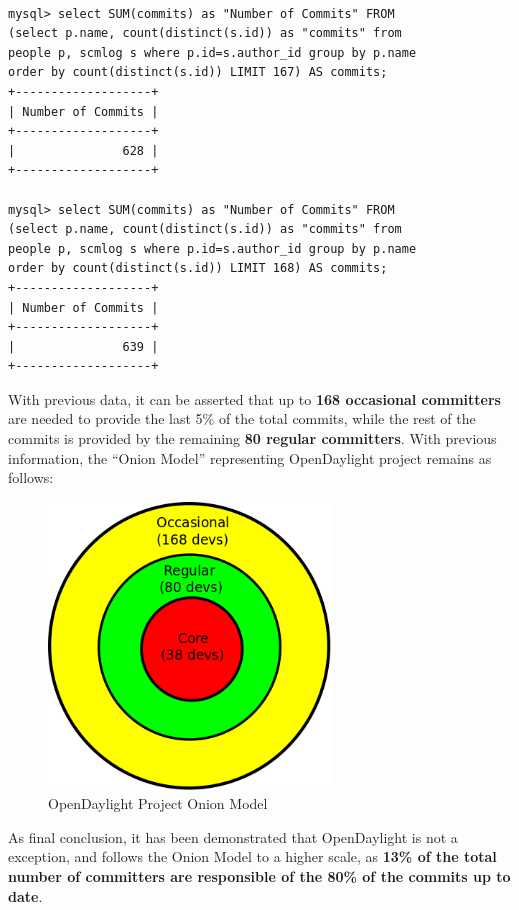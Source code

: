 \documentclass[a4paper, 12pt]{book}
\begin{document}
\begin{verbatim}

mysql> select SUM(commits) as "Number of Commits" FROM
(select p.name, count(distinct(s.id)) as "commits" from
people p, scmlog s where p.id=s.author_id group by p.name
order by count(distinct(s.id)) LIMIT 167) AS commits;
+-------------------+
| Number of Commits |
+-------------------+
|               628 |
+-------------------+

mysql> select SUM(commits) as "Number of Commits" FROM
(select p.name, count(distinct(s.id)) as "commits" from
people p, scmlog s where p.id=s.author_id group by p.name
order by count(distinct(s.id)) LIMIT 168) AS commits;
+-------------------+
| Number of Commits |
+-------------------+
|               639 |
+-------------------+

\end{verbatim}
With previous data, it can be asserted that up to \textbf{168 occasional committers} are needed to provide the last 5\% of the total commits, while the rest of the commits is provided by the remaining \textbf{80 regular committers}. With previous information, the ``Onion Model'' representing OpenDaylight project remains as follows:
\begin{center}
 \begin{figure}[H]
 \begin{center}
   \includegraphics[width=7.5cm]{img/onion01.png}
   \caption{OpenDaylight Project Onion Model}
   \label{fig:odl_onion_model}
 \end{center}
 \end{figure}
\end{center}
As final conclusion, it has been demonstrated that OpenDaylight is not a exception, and follows the Onion Model to a higher scale, as \textbf{13\% of the total number of committers are responsible of the 80\% of the commits up to date}.\\
\end{document}
